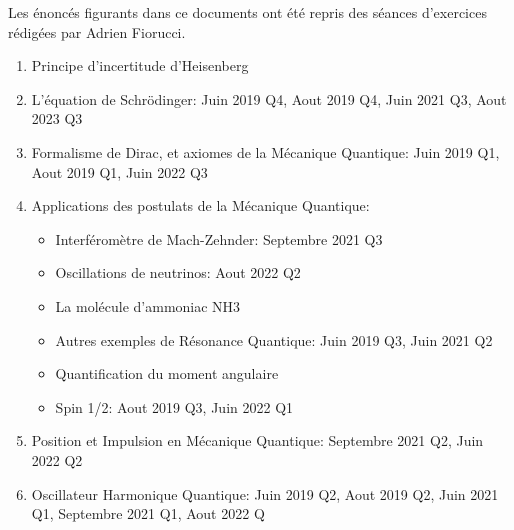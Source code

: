 \documentclass[a4paper,10pt]{report}
\begin{document}


\nocite{*}

\thispagestyle{plain}

${}$

\vspace{5cm}

Les énoncés figurants dans ce documents ont été repris des séances d'exercices rédigées par Adrien Fiorucci.

\begin{enumerate}
    \item Principe d'incertitude d'Heisenberg
    \item L'équation de Schrödinger: Juin 2019 Q4, Aout 2019 Q4, Juin 2021 Q3, Aout 2023 Q3
    \item Formalisme de Dirac, et axiomes de la Mécanique Quantique: Juin 2019 Q1, Aout 2019 Q1, Juin 2022 Q3
    \item Applications des postulats de la Mécanique Quantique: 
    \begin{itemize}
        \item Interféromètre de Mach-Zehnder: Septembre 2021 Q3
        \item Oscillations de neutrinos: Aout 2022 Q2
        \item La molécule d'ammoniac NH3
        \item Autres exemples de Résonance Quantique: Juin 2019 Q3, Juin 2021 Q2
        \item Quantification du moment angulaire
        \item Spin 1/2: Aout 2019 Q3, Juin 2022 Q1
    \end{itemize}
    \item Position et Impulsion en Mécanique Quantique: Septembre 2021 Q2, Juin 2022 Q2
    \item Oscillateur Harmonique Quantique: Juin 2019 Q2, Aout 2019 Q2, Juin 2021 Q1, Septembre 2021 Q1, Aout 2022 Q
\end{enumerate}

\pagebreak

\thispagestyle{plain}

\tableofcontents

\printbibliography

\pagebreak

\makeatletter
\renewcommand{\@chapapp}{Séance}
\makeatother




\end{document}
